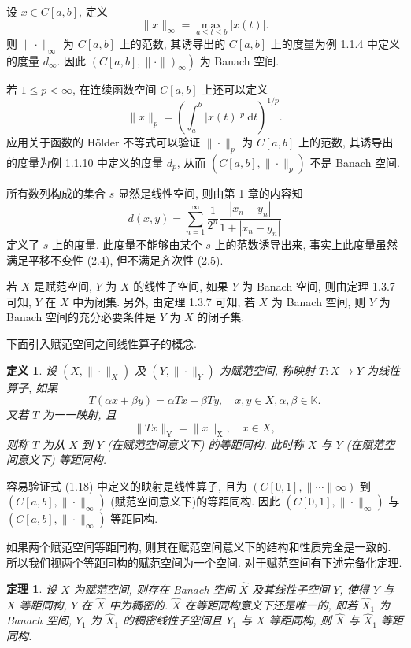 \documentclass[openany]{ctexbook}
\theoremstyle{kaiti}
\newtheorem{definition}{定义}[section]
\newtheorem{theorem}{定理}[section]
\theoremstyle{normal}
\begin{document}
设 $x \in C[a, b]$, 定义
$$
\|x\|_{\infty}=\max_{a \leqslant t \leqslant b}|x(t)|.
$$
则 $\|\cdot\|_{\infty}$ 为 $C[a, b]$ 上的范数, 其诱导出的 $C[a, b]$ 上的度量为例 1.1.4 中定义的度量 $d_{\infty}$. 因此 $\left.(C[a, b],\|\cdot\|)_{\infty}\right)$ 为 Banach 空间.

若 $1 \leqslant p<\infty$, 在连续函数空间 $C[a, b]$ 上还可以定义
$$
\|x\|_{p}=\left(\int_{a}^{b}|x(t)|{ }^{p} \mathrm{~d} t\right)^{1 / p}.
$$
应用关于函数的 Hölder 不等式可以验证 $\|\cdot\|_{p}$ 为 $C[a, b]$ 上的范数, 其诱导出的度量为例 1.1.10 中定义的度量 $d_{p}$, 从而 $\left(C[a, b],\|\cdot\|_{p}\right)$ 不是 Banach 空间.

所有数列构成的集合 $s$ 显然是线性空间, 则由第 1 章的内容知
$$
d(x, y)=\sum_{n=1}^{\infty} \frac{1}{2^n} \frac{\left|x_n-y_n\right|}{1+\left|x_n-y_n\right|}
$$
定义了 $s$ 上的度量. 此度量不能够由某个 $s$ 上的范数诱导出来, 事实上此度量虽然满足平移不变性 (2.4), 但不满足齐次性 (2.5).

若 $X$ 是赋范空间, $Y$ 为 $X$ 的线性子空间, 如果 $Y$ 为 Banach 空间, 则由定理 1.3.7 可知, $Y$ 在 $X$ 中为闭集. 另外, 由定理 1.3.7 可知, 若 $X$ 为 Banach 空间, 则 $Y$ 为 Banach 空间的充分必要条件是 $Y$ 为 $X$ 的闭子集.

下面引入赋范空间之间线性算子的概念.

\begin{definition}
设 $\left(X,\|\cdot\|_{X}\right)$ 及 $\left(Y,\|\cdot\|_{Y}\right)$ 为赋范空间, 称映射 $T: X \rightarrow Y$ 为线性算子, 如果
$$
T(\alpha x+\beta y)=\alpha T x+\beta T y, \quad x, y \in X, \alpha, \beta \in \mathbb{K}.
$$
又若 $T$ 为一一映射, 且
$$
\|T x\|_{\mathrm{Y}}=\|x\|_{\mathrm{X}}, \quad x \in X,
$$
则称 $T$ 为从 $X$ 到 $Y$ (在赋范空间意义下) 的等距同构. 此时称 $X$ 与 $Y$ (在赋范空间意义下) 等距同构.
\end{definition}

容易验证式 (1.18) 中定义的映射是线性算子, 且为 $(C[0,1],\|\cdots\| \infty)$ 到 $\left(C[a, b],\|\cdot\|_{\infty}\right)$ (赋范空间意义下)的等距同构. 因此 $\left(C[0,1],\|\cdot\|_{\infty}\right)$ 与 $\left(C[a, b],\|\cdot\|_{\infty}\right)$ 等距同构.

如果两个赋范空间等距同构, 则其在赋范空间意义下的结构和性质完全是一致的. 所以我们视两个等距同构的赋范空间为一个空间. 对于赋范空间有下述完备化定理.

\begin{theorem}
设 $X$ 为赋范空间, 则存在 Banach 空间 $\hat{X}$ 及其线性子空间 $Y$, 使得 $Y$ 与 $X$ 等距同构, $Y$ 在 $\hat{X}$ 中为稠密的. $\hat{X}$ 在等距同构意义下还是唯一的, 即若 $\hat{X}_1$ 为 Banach 空间, $Y_1$ 为 $\hat{X}_1$ 的稠密线性子空间且 $Y_1$ 与 $X$ 等距同构, 则 $\hat{X}$ 与 $\hat{X}_1$ 等距同构.
\end{theorem}
\end{document}
